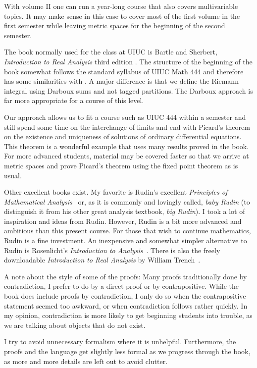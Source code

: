 With volume II one can run a year-long course that also covers multivariable
topics.  It may make sense in this case to cover most of the first volume
in the first semester while leaving metric spaces for the beginning of the
second semester.

The book normally used for the class at UIUC is Bartle and Sherbert,
\emph{Introduction to Real Analysis} third edition
\cite{BS}.
The structure of the beginning of the book somewhat follows the
standard syllabus of UIUC Math 444 and therefore has some similarities with
\cite{BS}.
A major difference is that we define the Riemann integral using
Darboux sums and not tagged partitions.  The Darboux approach is far more
appropriate for a course of this level.

Our approach allows us to fit a course such as UIUC 444 within a semester
and still spend some time on the interchange of limits and end with
Picard's theorem on the existence and uniqueness of solutions of ordinary
differential equations.
This theorem is a wonderful example
that uses many results proved in the book.  For more advanced students,
material may be covered faster so that we arrive at metric spaces and
prove Picard's theorem using the fixed point theorem as is usual.

Other excellent books exist.  My favorite is 
Rudin's excellent
\emph{Principles of Mathematical Analysis}~\cite{Rudin:baby}
or, as it is commonly and lovingly called, \emph{baby Rudin}
(to distinguish it from his other great analysis textbook,
\emph{big Rudin}).  I took a
lot of inspiration and ideas from Rudin.  However, Rudin is a bit more
advanced and ambitious than this present course.
For those that wish to continue
mathematics, Rudin is a fine investment.
An inexpensive and somewhat simpler alternative to Rudin is
Rosenlicht's \emph{Introduction to Analysis}~\cite{Rosenlicht}.
There is also the freely downloadable \emph{Introduction to Real
Analysis} by William Trench~\cite{Trench}.

\medskip

A note about the style of some of the proofs:  Many proofs
traditionally done by contradiction, I prefer to do by
a direct proof or by contrapositive.  While the book does include
proofs by contradiction, I only
do so when the contrapositive statement seemed too awkward, or when 
contradiction follows rather quickly.  In my opinion,
contradiction is more likely to get beginning students into trouble,
as we are talking about objects that do not exist.

I try to avoid unnecessary formalism where it is unhelpful.
Furthermore, the proofs and the language get slightly less formal as we
progress through the book, as more and more details are left out to avoid
clutter.

